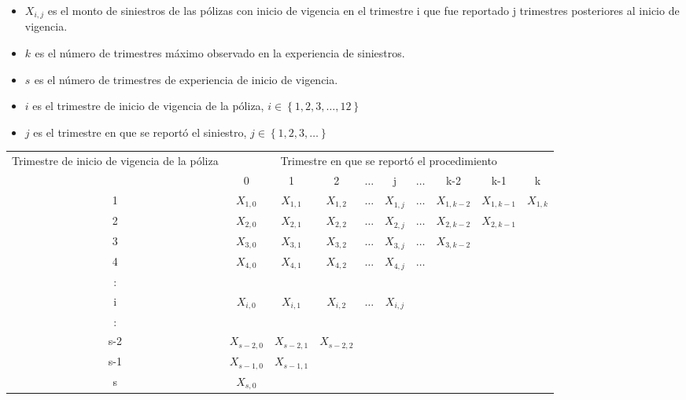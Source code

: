 \documentclass[11pt,twoside,openright,spanish]{report}
\numberwithin{equation}{chapter}
\numberwithin{figure}{chapter}
\numberwithin{table}{chapter}
\begin{document}
	\vspace{1cm}
	
	\begin{itemize}
		\item ${X}_{i,j}$ es el monto de siniestros de las pólizas con inicio de vigencia en el trimestre i que fue reportado j trimestres posteriores al inicio de vigencia.
		\item ${k}_{}$ es el número de trimestres máximo observado en la experiencia de siniestros.
		\item ${s}_{}$ es el número de trimestres de experiencia de inicio de vigencia.
		\item $i$ es el trimestre de inicio de vigencia de la póliza, $i\in \left\{1,2,3,\dots ,12\right\}$
		\item $j$ es el trimestre en que se reportó el siniestro,  $j\in \left\{1,2,3,\dots\right\}$
	\end{itemize}
	
	\vspace{1cm}

	\begin{table}[ht]
	\centering
	\begin{tabularx}{\linewidth}{c|ccccccccc}
		\multirow{2}{4cm}{Trimestre de inicio de vigencia de la póliza} & \multicolumn{9}{c}{Trimestre en que se reportó el procedimiento} \\
			& 0  & 1 & 2 & $ \dots $ & j & $\dots $ & k-2 & k-1 &  k \\
		\midrule
		1      &  $X_{1,0}^{}$ & $X_{1,1}^{}$ & $X_{1,2}^{}$ & $ \dots $ & $X_{1,j}^{}$ & $ \dots $ & $X_{1,k-2}^{}$ & $X_{1,k-1}^{}$ & $X_{1,k}^{}$ \\
		2      &  $X_{2,0}^{}$ & $X_{2,1}^{}$ & $X_{2,2}^{}$ & $ \dots $ & $X_{2,j}^{}$ & $ \dots $ & $X_{2,k-2}^{}$ & $X_{2,k-1}^{}$ & \\
		3      &  $X_{3,0}^{}$ & $X_{3,1}^{}$ & $X_{3,2}^{}$ & $ \dots $ & $X_{3,j}^{}$ & $ \dots $ & $X_{3,k-2}^{}$ & & \\
		4      &  $X_{4,0}^{}$ & $X_{4,1}^{}$ & $X_{4,2}^{}$ & $ \dots $ & $X_{4,j}^{}$ & $ \dots $ & & & \\
		:      & & & & & & & & &\\
		i      &  $X_{i,0}^{}$ & $X_{i,1}^{}$ & $X_{i,2}^{}$ & $ \dots $ & $X_{i,j}^{}$ & & & & \\
		:      & & & & & & & & & \\
		s-2      &  $X_{s-2,0}^{}$ & $X_{s-2,1}^{}$ & $X_{s-2,2}^{}$ & & & & & & \\
		s-1      &  $X_{s-1,0}^{}$ & $X_{s-1,1}^{}$ & & & & & & & \\
		s      &  $X_{s,0}^{}$ & & & & & & & & \\
	\end{tabularx}
	\end{table}
\end{document}
